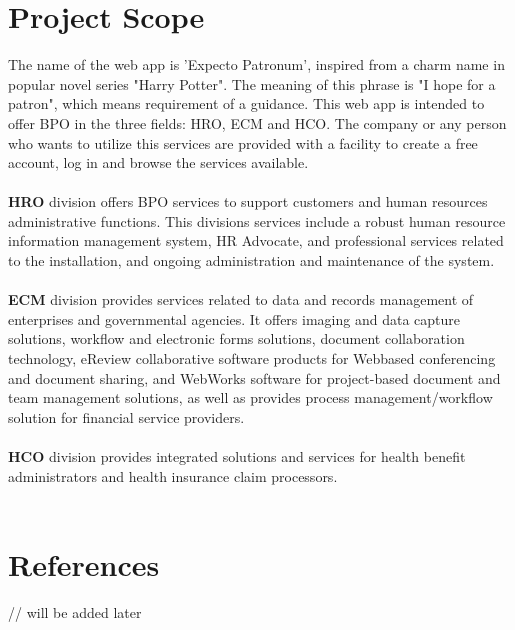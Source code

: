 \documentclass{scrreprt}
\begin{document}
\section{Project Scope}
The name of the web app is 'Expecto Patronum', inspired from a charm name in popular novel series "Harry Potter". The meaning 
of this phrase is "I hope for a patron", which means requirement of a guidance. This web app is intended to offer BPO
in the three fields: HRO, ECM and HCO. The company or any person who wants to utilize this services are provided with a facility to create a free
account, log in and browse the services available.\\ \\
\textbf{HRO} division offers BPO services to support customers and human resources administrative functions. This
divisions services include a robust human resource information management system, HR
Advocate, and professional services related to the installation, and ongoing administration
and maintenance of the system.\\ \\
\textbf{ECM} division provides
services related to data and records management of enterprises and governmental agencies.
It offers imaging and data capture solutions, workflow and electronic forms solutions,
document collaboration technology, eReview collaborative software products for Webbased
conferencing and document sharing, and WebWorks software for project-based
document and team management solutions, as well as provides process
management/workflow solution for financial service providers.\\ \\
\textbf{HCO} division provides integrated solutions and services for health benefit
administrators and health insurance claim processors.\\ \\


\section{References}
// will be added later
\end{document}
